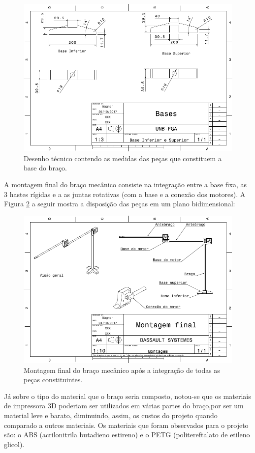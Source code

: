 \begin{figure}[H]
	\centering	\includegraphics[keepaspectratio=true,scale=0.65]{figuras/braco_mecanico_6.png}
	\caption{Desenho técnico contendo as medidas das peças que constituem a base do braço.}
	\label{des_fig10}
\end{figure}
A montagem final do braço mecânico consiste     na integração entre a base fixa, as 3 hastes rígidas e a as juntas rotativas (com a base e a conexão dos motores). A Figura \ref{des_fig11} a seguir mostra a disposição das peças em um plano bidimensional:

\begin{figure}[H]
	\centering	\includegraphics[keepaspectratio=true,scale=0.65]{figuras/braco_mecanico_7.png}
	\caption{Montagem final do braço mecânico após a integração de todas as peças constituintes.}
	\label{des_fig11}
\end{figure}
Já sobre o tipo do material que o braço seria composto, notou-se que os materiais de impressora 3D poderiam ser utilizados em várias partes do braço,por ser um material leve e barato, diminuindo, assim, os custos do projeto quando comparado a outros materiais. Os materiais que foram observados para o projeto são: o ABS (acrilonitrila butadieno estireno) e o PETG (politereftalato de etileno glicol)\cite{impressaofacil}.

